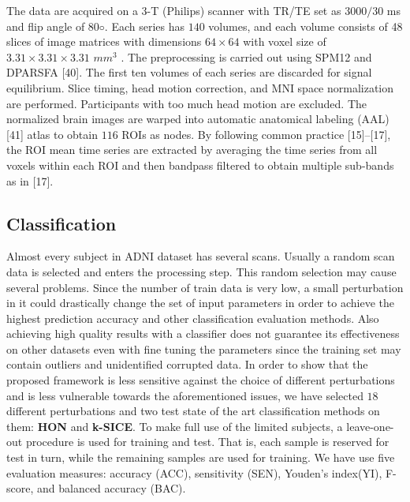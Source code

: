 \documentclass[preprint,12pt]{elsarticle}
\begin{document}
The data are acquired on a $3$-T (Philips) scanner with TR/TE set as $3000/30$
ms and flip angle of $80◦$. Each series has $140$ volumes, and each volume consists of 48 slices of image matrices with dimensions
$64 \times 64$
with voxel size of
$ 3.31 \times  3.31 \times 3.31$
$mm^3$ . The preprocessing is carried out using SPM12 and DPARSFA [40]. The
first ten volumes of each series are discarded for signal equilibrium. Slice timing, head motion correction, and MNI space normalization are performed. Participants with too much head motion are excluded. The normalized brain images are warped into automatic anatomical labeling (AAL) [41] atlas to obtain $116$ ROIs as nodes. By following common practice [15]–[17], the ROI mean time series are extracted by averaging the time series from all voxels within each ROI and then bandpass filtered to obtain multiple sub-bands as in [17].



\subsection{Classification}

Almost every subject in ADNI dataset has several scans. Usually a random scan data is selected and enters the processing step. This random selection may cause several problems. Since the number of train data is very low, a small perturbation in it could drastically change the set of input parameters in order to achieve the highest prediction accuracy and other classification evaluation methods. Also achieving high quality results with a classifier does not guarantee its effectiveness on other datasets even with fine tuning the parameters since the training set may contain outliers and unidentified corrupted data. 
In order to show that the proposed framework is less sensitive against the choice of different perturbations and is less vulnerable towards the aforementioned issues, we have selected $18$ different perturbations and two test state of the art classification methods on them: \textbf{HON} and \textbf{k-SICE}.   
To make full use of the limited subjects, a leave-one-out procedure is used for training and test. That is, each sample is reserved for test in turn, while the remaining samples are used for training.
We have use five
evaluation measures: accuracy (ACC), sensitivity (SEN), Youden’s index(YI), F-score, and balanced accuracy (BAC)\cite{r65}.
\end{document}
